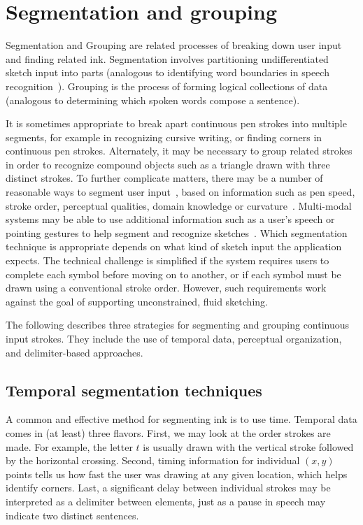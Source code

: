 \section{Segmentation and grouping}
\label{sec:recognition-segmentation}

Segmentation and Grouping are related processes of breaking down user
input and finding related ink. Segmentation involves partitioning
undifferentiated sketch input into parts (analogous to identifying
word boundaries in speech recognition~\cite{cole-survey}). Grouping is
the process of forming logical collections of data (analogous to
determining which spoken words compose a sentence).

It is sometimes appropriate to break apart continuous pen strokes into
multiple segments, for example in recognizing cursive writing, or
finding corners in continuous pen strokes. Alternately, it may be
necessary to group related strokes in order to recognize compound
objects such as a triangle drawn with three distinct strokes. To
further complicate matters, there may be a number of reasonable ways
to segment user input~\cite{mankoff-burlap}, based on information such
as pen speed, stroke order, perceptual qualities, domain knowledge or
curvature~\cite{kim-segmentation}. Multi-modal systems may be able to
use additional information such as a user's speech or pointing
gestures to help segment and recognize
sketches~\cite{oviatt-multimodal,anthony-multimodal}. Which
segmentation technique is appropriate depends on what kind of sketch
input the application expects. The technical challenge is simplified
if the system requires users to complete each symbol before moving on
to another, or if each symbol must be drawn using a conventional
stroke order. However, such requirements work against the goal of
supporting unconstrained, fluid sketching.

The following describes three strategies for segmenting and grouping
continuous input strokes. They include the use of temporal data,
perceptual organization, and delimiter-based approaches.

\subsection{Temporal segmentation techniques}
\label{sec:recognition-temporal}

A common and effective method for segmenting ink is to use
time. Temporal data comes in (at least) three flavors. First, we may
look at the order strokes are made. For example, the letter $t$ is
usually drawn with the vertical stroke followed by the horizontal
crossing. Second, timing information for individual $(x,y)$ points tells
us how fast the user was drawing at any given location, which helps
identify corners. Last, a significant delay between individual strokes
may be interpreted as a delimiter between elements, just as a pause in
speech may indicate two distinct sentences.

